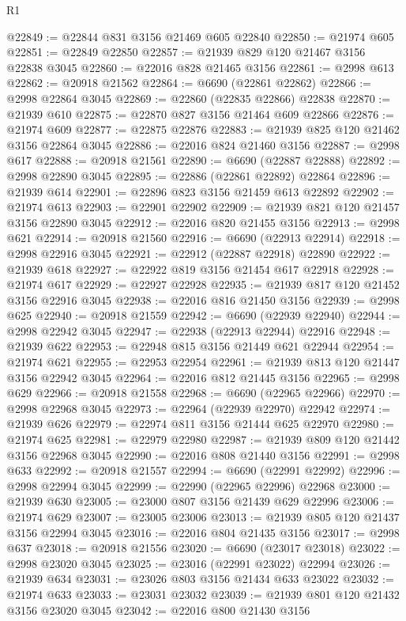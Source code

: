 \begin{lexlean}{R1}
\begin{coremodule}
@22849 := @22844 @831 @3156 @21469 @605 @22840
@22850 := @21974 @605
@22851 := @22849 @22850
@22857 := @21939 @829 @120 @21467 @3156 @22838 @3045
@22860 := @22016 @828 @21465 @3156
@22861 := @2998 @613
@22862 := @20918 @21562
@22864 := @6690 (@22861 @22862)
@22866 := @2998 @22864 @3045
@22869 := @22860 (@22835 @22866) @22838
@22870 := @21939 @610
@22875 := @22870 @827 @3156 @21464 @609 @22866
@22876 := @21974 @609
@22877 := @22875 @22876
@22883 := @21939 @825 @120 @21462 @3156 @22864 @3045
@22886 := @22016 @824 @21460 @3156
@22887 := @2998 @617
@22888 := @20918 @21561
@22890 := @6690 (@22887 @22888)
@22892 := @2998 @22890 @3045
@22895 := @22886 (@22861 @22892) @22864
@22896 := @21939 @614
@22901 := @22896 @823 @3156 @21459 @613 @22892
@22902 := @21974 @613
@22903 := @22901 @22902
@22909 := @21939 @821 @120 @21457 @3156 @22890 @3045
@22912 := @22016 @820 @21455 @3156
@22913 := @2998 @621
@22914 := @20918 @21560
@22916 := @6690 (@22913 @22914)
@22918 := @2998 @22916 @3045
@22921 := @22912 (@22887 @22918) @22890
@22922 := @21939 @618
@22927 := @22922 @819 @3156 @21454 @617 @22918
@22928 := @21974 @617
@22929 := @22927 @22928
@22935 := @21939 @817 @120 @21452 @3156 @22916 @3045
@22938 := @22016 @816 @21450 @3156
@22939 := @2998 @625
@22940 := @20918 @21559
@22942 := @6690 (@22939 @22940)
@22944 := @2998 @22942 @3045
@22947 := @22938 (@22913 @22944) @22916
@22948 := @21939 @622
@22953 := @22948 @815 @3156 @21449 @621 @22944
@22954 := @21974 @621
@22955 := @22953 @22954
@22961 := @21939 @813 @120 @21447 @3156 @22942 @3045
@22964 := @22016 @812 @21445 @3156
@22965 := @2998 @629
@22966 := @20918 @21558
@22968 := @6690 (@22965 @22966)
@22970 := @2998 @22968 @3045
@22973 := @22964 (@22939 @22970) @22942
@22974 := @21939 @626
@22979 := @22974 @811 @3156 @21444 @625 @22970
@22980 := @21974 @625
@22981 := @22979 @22980
@22987 := @21939 @809 @120 @21442 @3156 @22968 @3045
@22990 := @22016 @808 @21440 @3156
@22991 := @2998 @633
@22992 := @20918 @21557
@22994 := @6690 (@22991 @22992)
@22996 := @2998 @22994 @3045
@22999 := @22990 (@22965 @22996) @22968
@23000 := @21939 @630
@23005 := @23000 @807 @3156 @21439 @629 @22996
@23006 := @21974 @629
@23007 := @23005 @23006
@23013 := @21939 @805 @120 @21437 @3156 @22994 @3045
@23016 := @22016 @804 @21435 @3156
@23017 := @2998 @637
@23018 := @20918 @21556
@23020 := @6690 (@23017 @23018)
@23022 := @2998 @23020 @3045
@23025 := @23016 (@22991 @23022) @22994
@23026 := @21939 @634
@23031 := @23026 @803 @3156 @21434 @633 @23022
@23032 := @21974 @633
@23033 := @23031 @23032
@23039 := @21939 @801 @120 @21432 @3156 @23020 @3045
@23042 := @22016 @800 @21430 @3156

\end{coremodule}
\end{lexlean}
